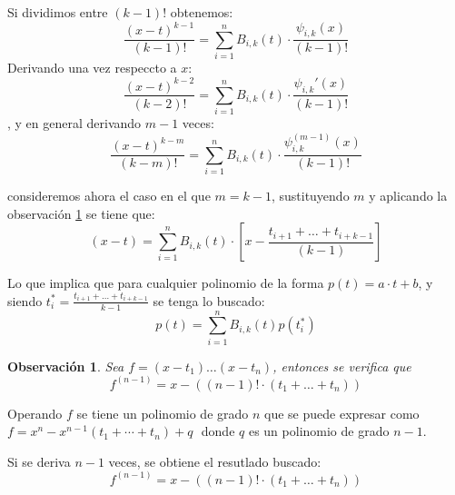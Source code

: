 \documentclass[12pt,a4paper]{article}
\newtheorem{observacion}{Observación}
\begin{document}
\begin{enumerate}
  Si dividimos entre $(k-1)!$ obtenemos:
  $$\frac{(x-t)^{k-1}}{(k-1)!}=\sum\limits_{i=1}^{n}B_{i,k}(t)\cdot\frac{\psi_{i,k}(x)}{(k-1)!}$$
  Derivando una vez respeccto a $x$:
  $$\frac{(x-t)^{k-2}}{(k-2)!}=\sum\limits_{i=1}^{n}B_{i,k}(t)\cdot\frac{\psi_{i,k}'(x)}{(k-1)!}$$,
  y en general derivando $m-1$ veces:
  $$\frac{(x-t)^{k-m}}{(k-m)!}=\sum\limits_{i=1}^{n}B_{i,k}(t)\cdot\frac{\psi_{i,k}^{(m-1)}(x)}{(k-1)!}$$


  consideremos ahora el caso en el que $m=k-1$, sustituyendo $m$ y
  aplicando la observación \ref{observacion:1} se tiene
  que:
  $$(x-t)=\sum\limits_{i=1}^{n}B_{i,k}(t)\cdot\left[x-\frac{t_{i+1}+\dots+t_{i+k-1}}{(k-1)}\right]$$

  Lo que implica que para cualquier polinomio de la forma
  $p(t)=a \cdot t + b$, y siendo
  $t_{i}^{*}=\frac{t_{i+1}+\dots+t_{i+k-1}}{k-1}$ se tenga lo buscado:
  $$p(t)=\sum\limits_{i=1}^{n}B_{i,k}(t)p(t_{i}^{*})$$

  \vspace{1cm}

  \begin{observacion}
    \label{observacion:1}
    Sea $f=(x-t_1)\dots(x-t_{n})$, entonces se verifica
    que $$f^{(n-1)}=x-\left((n-1)!\cdot(t_1+\dots+t_{n})\right)$$
  \end{observacion}
    Operando $f$ se tiene un polinomio de grado $n$ que se puede expresar
    como\\$f=x^{n}-x^{n-1}(t_1+\cdots+t_{n})+q$\,\,\,\,donde $q$ es un polinomio de
    grado $n-1$.

    Si se deriva $n-1$ veces, se obtiene el resutlado buscado:
    $$f^{(n-1)}=x-\left((n-1)!\cdot(t_1+\dots+t_{n})\right)$$

\end{enumerate} 
\end{document}
